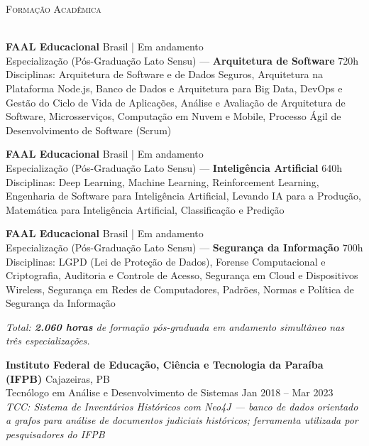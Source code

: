 \documentclass[a4paper]{article}
\newcommand{\lineunder}{
    \vspace*{-8pt} \\
    \hspace*{-18pt} \hrulefill \\
}
\newcommand{\header}[1]{
    {\hspace*{-18pt}\vspace*{6pt} \textsc{#1}}
    \vspace*{-6pt} \lineunder
}
\begin{document}
\vspace{3mm}

\header{Formação Acadêmica}
\vspace{2mm}

\textbf{FAAL Educacional} \hfill Brasil | Em andamento\\
Especializa\c{c}\~{a}o (P\'{o}s-Gradua\c{c}\~{a}o Lato Sensu) — \textbf{Arquitetura de Software} \hfill 720h\\
{\small Disciplinas: Arquitetura de Software e de Dados Seguros, Arquitetura na Plataforma Node.js,
Banco de Dados e Arquitetura para Big Data, DevOps e Gestão do Ciclo de Vida de Aplicações,
Análise e Avaliação de Arquitetura de Software, Microsserviços, Computação em Nuvem e Mobile,
Processo Ágil de Desenvolvimento de Software (Scrum)}\\
\vspace{2mm}

\textbf{FAAL Educacional} \hfill Brasil | Em andamento\\
Especialização (Pós-Graduação Lato Sensu) — \textbf{Inteligência Artificial} \hfill 640h\\
{\small Disciplinas: Deep Learning, Machine Learning, Reinforcement Learning, Engenharia de Software
para Inteligência Artificial, Levando IA para a Produção, Matemática para Inteligência Artificial,
Classificação e Predição}\\
\vspace{2mm}

\textbf{FAAL Educacional} \hfill Brasil | Em andamento\\
Especialização (Pós-Graduação Lato Sensu) — \textbf{Segurança da Informação} \hfill 700h\\
{\small Disciplinas: LGPD (Lei de Proteção de Dados), Forense Computacional e Criptografia,
Auditoria e Controle de Acesso, Segurança em Cloud e Dispositivos Wireless,
Segurança em Redes de Computadores, Padrões, Normas e Política de Segurança da Informação}\\
\vspace{4mm}

{\small \textit{Total: \textbf{2.060 horas} de forma\c{c}\~{a}o p\'{o}s-graduada em andamento simult\^{a}neo nas tr\^{e}s especializa\c{c}\~{o}es.}}\\
\vspace{3mm}

\textbf{Instituto Federal de Educação, Ciência e Tecnologia da Paraíba (IFPB)} \hfill Cajazeiras, PB\\
Tecnólogo em Análise e Desenvolvimento de Sistemas \hfill Jan 2018 -- Mar 2023\\
\textit{TCC: Sistema de Inventários Históricos com Neo4J — banco de dados orientado a grafos para análise de documentos judiciais históricos; ferramenta utilizada por pesquisadores do IFPB}\\
\vspace{2mm}
\end{document}
